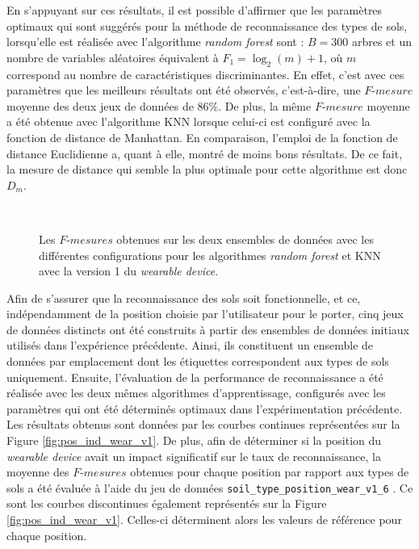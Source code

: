 En s'appuyant sur ces résultats, il est possible d'affirmer que les paramètres optimaux qui sont suggérés pour la méthode de reconnaissance des types de sols, lorsqu'elle est réalisée avec l'algorithme \textit{random forest} sont : $B=300$ arbres et un nombre de variables aléatoires équivalent à $F_1=\log_2(m) + 1$, où $m$ correspond au nombre de caractéristiques discriminantes. En effet, c'est avec ces paramètres que les meilleurs résultats ont été observés, c'est-à-dire, une $F\mbox{-}mesure$ moyenne des deux jeux de données de $86\%$. De plus, la même $F\mbox{-}mesure$ moyenne a été obtenue avec l'algorithme \acs{KNN} lorsque celui-ci est configuré avec la fonction de distance de Manhattan. En comparaison, l'emploi de la fonction de distance Euclidienne a, quant à elle, montré de moins bons résultats. De ce fait, la mesure de distance qui semble la plus optimale pour cette algorithme est donc $D_m$.

\begin{figure}[H]
    \centering
    \\[20pt]
    \caption{Les $F\mbox{-} mesures$ obtenues sur les deux ensembles de données avec les différentes configurations pour les algorithmes \textit{random forest} et \acs{KNN} avec la version 1 du \textit{wearable device}.}
    \label{fig:results_wear_v1}
\end{figure}

Afin de s'assurer que la reconnaissance des sols soit fonctionnelle, et ce, indépendamment de la position choisie par l'utilisateur pour le porter, cinq jeux de données distincts ont été construits à partir des ensembles de données initiaux utilisés dans l'expérience précédente. Ainsi, ils constituent un ensemble de données par emplacement dont les étiquettes correspondent aux types de sols uniquement. Ensuite, l'évaluation de la performance de reconnaissance a été réalisée avec les deux mêmes algorithmes d'apprentissage, configurés avec les paramètres qui ont été déterminés optimaux dans l'expérimentation précédente. Les résultats obtenus sont données par les courbes continues représentées sur la Figure \ref{fig:pos_ind_wear_v1}. De plus, afin de déterminer si la position du \textit{wearable device} avait un impact significatif sur le taux de reconnaissance, la moyenne des $F\mbox{-}mesures$ obtenues pour chaque position par rapport aux types de sols a été évaluée à l'aide du jeu de données \og \texttt{soil\_type\_position\_wear\_v1\_6} \fg. Ce sont les courbes discontinues également représentés sur la Figure \ref{fig:pos_ind_wear_v1}. Celles-ci déterminent alors les valeurs de référence pour chaque position.

